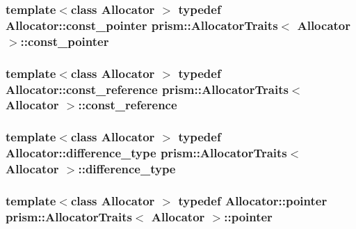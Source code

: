 \subsubsection[{\texorpdfstring{const\+\_\+pointer}{const_pointer}}]{\setlength{\rightskip}{0pt plus 5cm}template$<$class Allocator $>$ typedef {\bf Allocator\+::const\+\_\+pointer} {\bf prism\+::\+Allocator\+Traits}$<$ {\bf Allocator} $>$\+::{\bf const\+\_\+pointer}}\hypertarget{structprism_1_1_allocator_traits_abce8f3352b34f42a7a81bff1b5546b48}{}\label{structprism_1_1_allocator_traits_abce8f3352b34f42a7a81bff1b5546b48}
\subsubsection[{\texorpdfstring{const\+\_\+reference}{const_reference}}]{\setlength{\rightskip}{0pt plus 5cm}template$<$class Allocator $>$ typedef {\bf Allocator\+::const\+\_\+reference} {\bf prism\+::\+Allocator\+Traits}$<$ {\bf Allocator} $>$\+::{\bf const\+\_\+reference}}\hypertarget{structprism_1_1_allocator_traits_a136b98e2698754b03398194f80edbf33}{}\label{structprism_1_1_allocator_traits_a136b98e2698754b03398194f80edbf33}
\subsubsection[{\texorpdfstring{difference\+\_\+type}{difference_type}}]{\setlength{\rightskip}{0pt plus 5cm}template$<$class Allocator $>$ typedef {\bf Allocator\+::difference\+\_\+type} {\bf prism\+::\+Allocator\+Traits}$<$ {\bf Allocator} $>$\+::{\bf difference\+\_\+type}}\hypertarget{structprism_1_1_allocator_traits_ac5e3111044ebe0f5c85c24b0ae9a2875}{}\label{structprism_1_1_allocator_traits_ac5e3111044ebe0f5c85c24b0ae9a2875}
\subsubsection[{\texorpdfstring{pointer}{pointer}}]{\setlength{\rightskip}{0pt plus 5cm}template$<$class Allocator $>$ typedef {\bf Allocator\+::pointer} {\bf prism\+::\+Allocator\+Traits}$<$ {\bf Allocator} $>$\+::{\bf pointer}}\hypertarget{structprism_1_1_allocator_traits_ae6cca8a97ab96e399c40b5774f425d6f}{}\label{structprism_1_1_allocator_traits_ae6cca8a97ab96e399c40b5774f425d6f}
